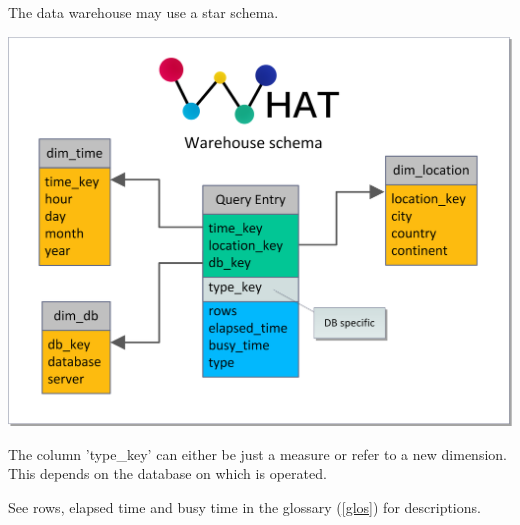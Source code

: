 The \gls{data warehouse} may use a \gls{star schema}.
\begin{center}
\includegraphics[width=1\linewidth]{Pictures/WareHouseSchema.png} 
\end{center}   
The column 'type\_key' can either be just a \gls{measure} or refer to a new \gls{dimension}. This depends on the \gls{database}
on which is operated.  

See \glspl{row}, \gls{elapsed time} and \gls{busy time} in the glossary (\ref{glos}) for descriptions. 



